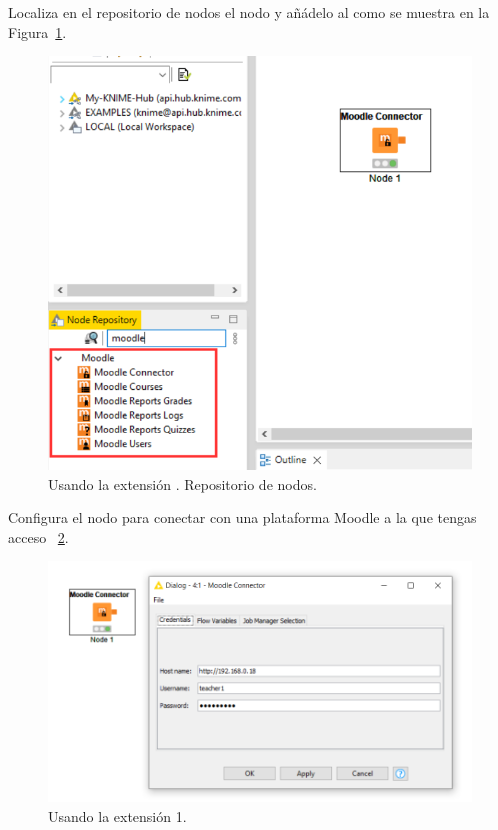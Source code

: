 Localiza en el repositorio de nodos el nodo  y añádelo al  como se muestra en la Figura~\ref{fig:extension0}.

\begin{figure}[!htb]
	\centering
	\includegraphics[width=1\textwidth]{img/manual_usuario_node_repository.png}
	\caption{Usando la extensión . Repositorio de nodos. }
	\label{fig:extension0}
\end{figure}
\FloatBarrier

Configura el nodo para conectar con una plataforma Moodle a la que tengas acceso ~\ref{fig:extension1}. 
\

\begin{figure}[!htb]
	\centering
	\includegraphics[width=1\textwidth]{img/manual_usuario_moodle_connector.png}
	\caption{Usando la extensión  1.}
	\label{fig:extension1}
\end{figure}
\FloatBarrier

